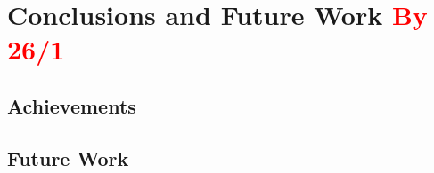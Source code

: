 \chapter{Conclusions and Future Work \textcolor{red}{By 26/1}}
\label{chapter:conclusions}

\section{Achievements}
\label{sec:chp7-1_achievements}


\section{Future Work}
\label{sec:chp7-2_future_work}